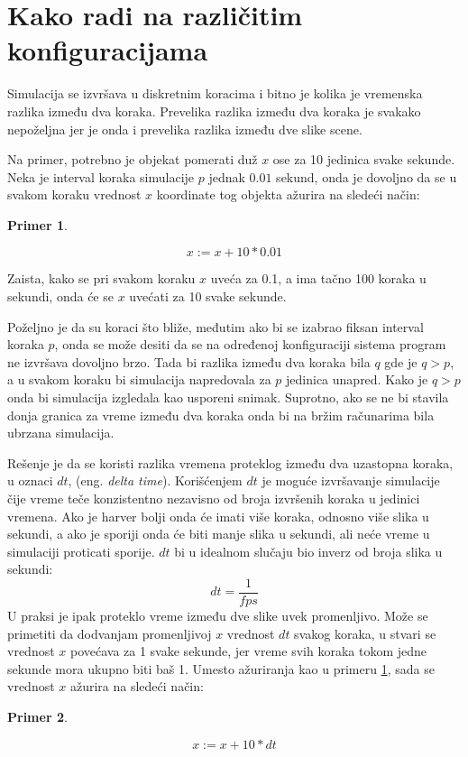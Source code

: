 \documentclass[12pt,oneside]{memoir}
\newtheorem{primer}{Primer}[section]
\begin{document}
\section{Kako radi na različitim konfiguracijama}

Simulacija se izvršava u diskretnim koracima i bitno je kolika je vremenska razlika između dva koraka.
Prevelika razlika između dva koraka je svakako nepoželjna jer je onda i prevelika razlika između dve slike scene.

Na primer, potrebno je objekat pomerati duž $x$ ose za 10 jedinica svake sekunde. Neka je interval koraka simulacije 
$p$ jednak $0.01$ sekund, onda je dovoljno da se u svakom koraku vrednost $x$ koordinate tog objekta ažurira na sledeći način:

\begin{primer}
\label{pr:x}

$$ x:= x + 10 * 0.01 $$
\end{primer}

Zaista, kako se pri svakom koraku $x$ uveća za 0.1, a ima tačno 100 koraka u sekundi, onda će se $x$ uvećati za 10 svake sekunde.

Poželjno je da su koraci što bliže, međutim ako bi se izabrao fiksan interval koraka $p$, onda se može desiti
da se na određenoj konfiguraciji sistema program ne izvršava dovoljno brzo. 
Tada bi razlika između dva koraka bila $q$ gde je $q > p$, a u svakom koraku bi simulacija napredovala za 
$p$ jedinica unapred. Kako je $q > p$ onda bi simulacija izgledala kao usporeni snimak.
Suprotno, ako se ne bi stavila donja granica za vreme između dva koraka onda bi na bržim računarima 
bila ubrzana simulacija.

Rešenje je da se koristi razlika vremena proteklog između dva uzastopna koraka, u oznaci $dt$, (eng. {\em delta time}).
Korišćenjem $dt$ je moguće izvršavanje simulacije čije vreme teče konzistentno nezavisno od broja izvršenih koraka u 
jedinici vremena. Ako je harver bolji onda će imati više koraka, odnosno više slika u sekundi, a ako je 
sporiji onda će biti manje slika u sekundi, ali neće vreme u simulaciji proticati sporije.
$dt$ bi u idealnom slučaju bio inverz od broja slika u sekundi:
$$dt = \frac{1}{fps}$$
U praksi je ipak proteklo vreme između dve slike uvek promenljivo.
Može se primetiti da dodvanjam promenljivoj $x$ vrednost $dt$ svakog koraka, u stvari se vrednost $x$ povećava 
za 1 svake sekunde, jer vreme svih koraka tokom jedne sekunde mora ukupno biti baš 1.
Umesto ažuriranja kao u primeru \ref{pr:x}, sada se vrednost $x$ ažurira na sledeći način:
\begin{primer}
	\label{pr:x2}
	
	$$ x:= x + 10 * dt $$
\end{primer}
\end{document}
